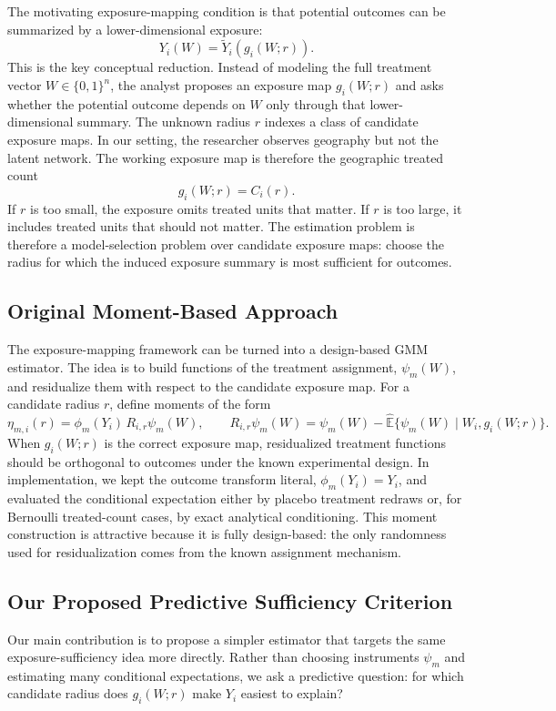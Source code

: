 \documentclass[11pt]{article}
\begin{document}
The motivating exposure-mapping condition is that potential outcomes can be summarized by a lower-dimensional exposure:
\[
Y_i(W)=\widetilde{Y}_i(g_i(W;r)).
\]
This is the key conceptual reduction. Instead of modeling the full treatment vector $W\in\{0,1\}^n$, the analyst proposes an exposure map $g_i(W;r)$ and asks whether the potential outcome depends on $W$ only through that lower-dimensional summary. The unknown radius $r$ indexes a class of candidate exposure maps. In our setting, the researcher observes geography but not the latent network. The working exposure map is therefore the geographic treated count
\[
g_i(W;r)=C_i(r).
\]
If $r$ is too small, the exposure omits treated units that matter. If $r$ is too large, it includes treated units that should not matter. The estimation problem is therefore a model-selection problem over candidate exposure maps: choose the radius for which the induced exposure summary is most sufficient for outcomes.

\subsection{Original Moment-Based Approach}

The exposure-mapping framework can be turned into a design-based GMM estimator. The idea is to build functions of the treatment assignment, $\psi_m(W)$, and residualize them with respect to the candidate exposure map. For a candidate radius $r$, define moments of the form
\[
\eta_{m,i}(r)=\phi_m(Y_i)\,R_{i,r}\psi_m(W),
\qquad
R_{i,r}\psi_m(W)=\psi_m(W)-\widehat{\mathbb{E}}\{\psi_m(W)\mid W_i,g_i(W;r)\}.
\]
When $g_i(W;r)$ is the correct exposure map, residualized treatment functions should be orthogonal to outcomes under the known experimental design. In implementation, we kept the outcome transform literal, $\phi_m(Y_i)=Y_i$, and evaluated the conditional expectation either by placebo treatment redraws or, for Bernoulli treated-count cases, by exact analytical conditioning. This moment construction is attractive because it is fully design-based: the only randomness used for residualization comes from the known assignment mechanism.

\subsection{Our Proposed Predictive Sufficiency Criterion}

Our main contribution is to propose a simpler estimator that targets the same exposure-sufficiency idea more directly. Rather than choosing instruments $\psi_m$ and estimating many conditional expectations, we ask a predictive question: for which candidate radius does $g_i(W;r)$ make $Y_i$ easiest to explain?
\end{document}
